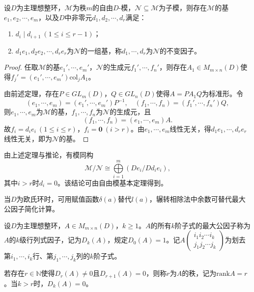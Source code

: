 \documentclass[../../main.tex]{subfiles}%
\begin{document}
\begin{corollary}
设$D$为主理想整环，$\mathscr{M}$为秩$m$的自由$D$-模，$\mathscr{N}\subseteq\mathscr{M}$为子模，则存在$\mathscr{M}$的基$e_1,e_2,\cdots,e_m$，以及$D$中非零元$d_1,d_2,\cdots,d_r$满足：
\begin{enumerate}[(1)]
\item $d_i\mid d_{i+1}\ (1\leqslant i\leqslant r-1)$；
\item $d_1e_1,d_2e_2,\cdots,d_re_r$为$\mathscr{N}$的一组基，称$d_1,\cdots,d_r$为$\mathscr{N}$的不变因子。
\end{enumerate}
\end{corollary}

\begin{proof}
任取$\mathscr{M}$的基$e_1',\cdots,e_m'$，$\mathscr{N}$的生成元$f_1',\cdots,f_n'$，则存在$A_1\in M_{m\times n}(D)$使得$f_j'=(e_1',\cdots,e_m')\mathrm{col}_jA_1$。

由前述定理，存在$P\in GL_m(D)$，$Q\in GL_n(D)$使得$A=PA_1Q$为标准形。令
$$(e_1,\cdots,e_m)=(e_1',\cdots,e_m')P^{-1},\quad (f_1,\cdots,f_n)=(f_1',\cdots,f_n')Q,$$
则$e_1,\cdots,e_m$为$\mathscr{M}$的基，$f_1,\cdots,f_n$为$\mathscr{N}$的生成元，且
$$(f_1,\cdots,f_n)=(e_1,\cdots,e_m)A.$$
故$f_i=d_ie_i\ (1\leqslant i\leqslant r)$，$f_i=\boldsymbol{0}\ (i>r)$。由$e_1,\cdots,e_m$线性无关，得$d_1e_1,\cdots,d_re_r$线性无关，即为$\mathscr{N}$的基。
\end{proof}

\begin{remark}
由上述定理与推论，有模同构
$$\mathscr{M}/\mathscr{N}\cong\bigoplus\limits_{i=1}^m(De_i/Dd_ie_i),$$
其中$i>r$时$d_i=0$。该结论可由自由模基本定理得到。
\end{remark}

\begin{remark}
当$D$为欧氏环时，可用赋值函数$\delta(a)$替代$l(a)$，辗转相除法中余数可替代最大公因子简化计算。
\end{remark}

\begin{definition}
设$D$为主理想整环，$A\in M_{m\times n}(D)$，$k\geqslant1$。$A$的所有$k$阶子式的最大公因子称为$A$的$k$级行列式因子，记为$D_k(A)$，规定$D_0(A)=1$。记$A\begin{pmatrix}i_1i_2\cdots i_k\\j_1j_2\cdots j_k\end{pmatrix}$为划去第$i_1,\cdots,i_k$行、第$j_1,\cdots,j_k$列的$k$阶子式。

若存在$r\in\mathbb{N}$使得$D_r(A)\neq0$且$D_{r+1}(A)=0$，则称$r$为$A$的秩，记为$\mathrm{rank}A=r$。当$k>r$时，$D_k(A)=0$。
\end{definition}
\end{document}
